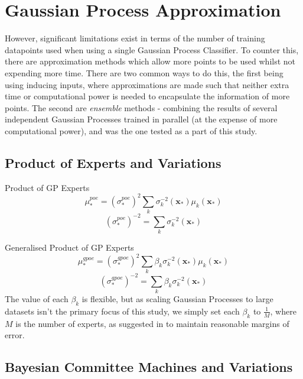 \section{Gaussian Process Approximation}

However, significant limitations exist in terms of the number of training datapoints used when using a single Gaussian Process Classifier. To counter this, there are approximation methods which allow more points to be used whilst not expending more time. There are two common ways to do this, the first being using inducing inputs, where approximations are made such that neither extra time or computational power is needed to encapsulate the information of more points. The second are \textit{ensemble} methods - combining the results of several independent Gaussian Processes trained in parallel (at the expense of more computational power), and was the one tested as a part of this study.

\subsection{Product of Experts and Variations}

Product of GP Experts
\begin{equation}
    \mu_*^{poe} = (\sigma_*^{poe})^2 \sum_k \sigma_k^{-2} (\mathbf{x_*}) \mu_k (\mathbf{x_*})
\end{equation}
\begin{equation}
    (\sigma_*^{poe})^{-2} = \sum_k \sigma_k^{-2} (\mathbf{x_*})
\end{equation}

Generalised Product of GP Experts
\begin{equation}
    \mu_*^{gpoe} = (\sigma_*^{gpoe})^2 \sum_k \beta_k \sigma_k^{-2} (\mathbf{x_*}) \mu_k (\mathbf{x_*})
\end{equation}
\begin{equation}
    (\sigma_*^{gpoe})^{-2} = \sum_k \beta_k \sigma_k^{-2} (\mathbf{x_*})
\end{equation}
The value of each $\beta_k$ is flexible, but as scaling Gaussian Processes to large datasets isn't the primary focus of this study, we simply set each $\beta_k$ to $\frac{1}{M}$, where $M$ is the number of experts, as suggested in \citep{deisenroth15} to maintain reasonable margins of error.

\subsection{Bayesian Committee Machines and Variations}

